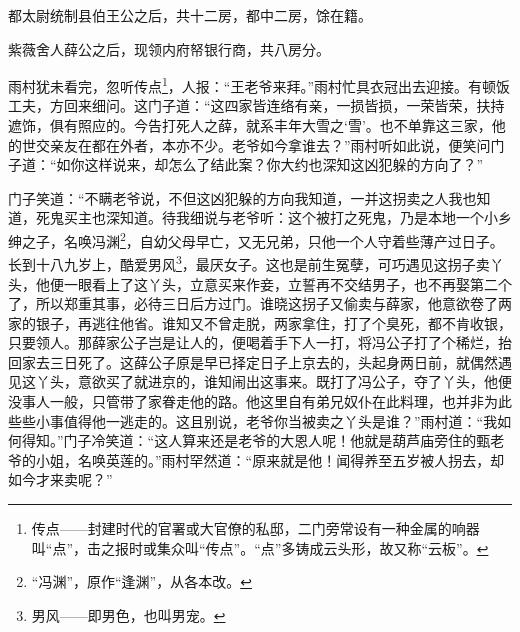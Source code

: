 \par 都太尉统制县伯王公之后，共十二房，都中二房，馀在籍。
\par 紫薇舍人薛公之后，现领内府帑银行商，共八房分。
\par 雨村犹未看完，忽听传点\footnote{传点——封建时代的官署或大官僚的私邸，二门旁常设有一种金属的响器叫“点”，击之报时或集众叫“传点”。“点”多铸成云头形，故又称“云板”。}，人报：“王老爷来拜。”雨村忙具衣冠出去迎接。有顿饭工夫，方回来细问。这门子道：“这四家皆连络有亲，一损皆损，一荣皆荣，扶持遮饰，俱有照应的。今告打死人之薛，就系丰年大雪之‘雪’。也不单靠这三家，他的世交亲友在都在外者，本亦不少。老爷如今拿谁去？”雨村听如此说，便笑问门子道：“如你这样说来，却怎么了结此案？你大约也深知这凶犯躲的方向了？”
\par 门子笑道：“不瞒老爷说，不但这凶犯躲的方向我知道，一并这拐卖之人我也知道，死鬼买主也深知道。待我细说与老爷听：这个被打之死鬼，乃是本地一个小乡绅之子，名唤冯渊\footnote{“冯渊”，原作“逢渊”，从各本改。}，自幼父母早亡，又无兄弟，只他一个人守着些薄产过日子。长到十八九岁上，酷爱男风\footnote{男风——即男色，也叫男宠。}，最厌女子。这也是前生冤孽，可巧遇见这拐子卖丫头，他便一眼看上了这丫头，立意买来作妾，立誓再不交结男子，也不再娶第二个了，所以郑重其事，必待三日后方过门。谁晓这拐子又偷卖与薛家，他意欲卷了两家的银子，再逃往他省。谁知又不曾走脱，两家拿住，打了个臭死，都不肯收银，只要领人。那薛家公子岂是让人的，便喝着手下人一打，将冯公子打了个稀烂，抬回家去三日死了。这薛公子原是早已择定日子上京去的，头起身两日前，就偶然遇见这丫头，意欲买了就进京的，谁知闹出这事来。既打了冯公子，夺了丫头，他便没事人一般，只管带了家眷走他的路。他这里自有弟兄奴仆在此料理，也并非为此些些小事值得他一逃走的。这且别说，老爷你当被卖之丫头是谁？”雨村道：“我如何得知。”门子冷笑道：“这人算来还是老爷的大恩人呢！他就是葫芦庙旁住的甄老爷的小姐，名唤英莲的。”雨村罕然道：“原来就是他！闻得养至五岁被人拐去，却如今才来卖呢？”
